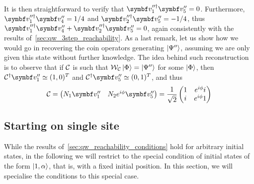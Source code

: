 \begin{example}[label=ex:qw_conditions_few_steps]
\begin{equation}
\begin{aligned}
    \end{aligned}
    \end{equation}
    It is then straightforward to verify that
    $\bs v_1^{\prime\prime\dagger}\bs v_5'' = 0$.
    Furthermore,
    $\bs v_1^{\prime\prime\dagger}\bs v_4'' = 1/4$
    and $\bs v_2^{\prime\prime\dagger}\bs v_5'' = -1/4$,
    thus 
    $\bs v_1^{\prime\prime\dagger}\bs v_4'' + \bs v_2^{\prime\prime\dagger}\bs v_5'' = 0$,
    again consistently with the results of~\cref{sec:qw_3step_reachability}.
    As a last remark, let us show how we would go in recovering the coin operators generating $\ket{\Psi''}$, assuming we are only given this state without further knowledge.
    The idea behind such reconstruction is to observe that if ${\mathcal{C}}$ is such that ${\mathcal{W}}_{{\mathcal{C}}}\ket{\Phi}=\ket{\Psi''}$ for some $\ket\Phi$, then $\calC^\dagger \bs v_1''\simeq(1,0)^T$ and $\calC^\dagger \bs v_5''\simeq(0,1)^T$, and thus
    \begin{equation}
        \calC = \begin{pmatrix}
            N_1 \bs v_1'' & N_2 e^{i\phi} \bs v_5''
        \end{pmatrix} = \frac{1}{\sqrt2}
        \begin{pmatrix}
            1 & e^{i\phi}i \\
            i & e^{i\phi}1
        \end{pmatrix}
    \end{equation}
\end{example}

\subsection{Starting on single site}
\label{sec:qw_starting_on_single_site}

While the results of~\cref{sec:qw_reachability_conditions} hold for arbitrary initial states, in the following we will restrict to the special condition of initial states of the form $\ket{1,\alpha}$, that is, with a fixed initial position.
In this section, we will specialise the conditions to this special case.



